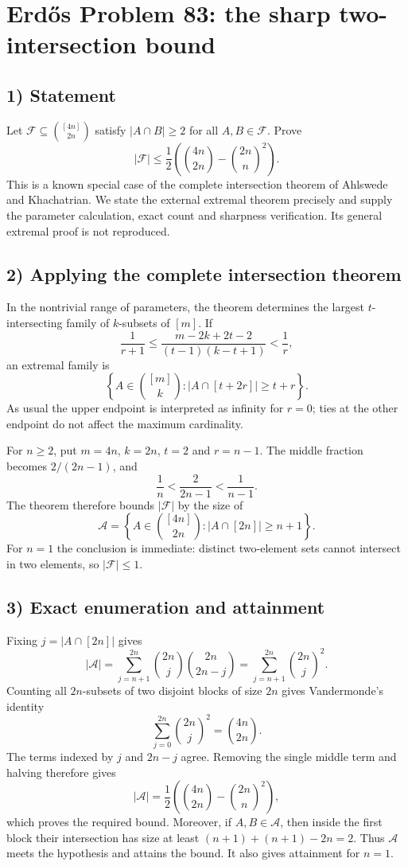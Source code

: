 \section{Erd\H{o}s Problem 83: the sharp two-intersection bound}

\subsection{1) Statement}
Let $\mathcal F\subseteq\binom{[4n]}{2n}$ satisfy
$|A\cap B|\geq2$ for all $A,B\in\mathcal F$. Prove
\[
 |\mathcal F|\leq\frac12\left(\binom{4n}{2n}-\binom{2n}{n}^2\right).
\]
This is a known special case of the complete intersection theorem
of Ahlswede and Khachatrian. We state the external extremal theorem
precisely and supply the parameter calculation, exact count and
sharpness verification. Its general extremal proof is not reproduced.

\subsection{2) Applying the complete intersection theorem}
In the nontrivial range of parameters, the theorem determines the
largest $t$-intersecting family of $k$-subsets of $[m]$. If
\[
 \frac1{r+1}\leq
 \frac{m-2k+2t-2}{(t-1)(k-t+1)}<\frac1r,
\]
an extremal family is
\[
 \left\{A\in\binom{[m]}k:|A\cap[t+2r]|\geq t+r\right\}.
\]
As usual the upper endpoint is interpreted as infinity for $r=0$;
ties at the other endpoint do not affect the maximum cardinality.

For $n\geq2$, put $m=4n$, $k=2n$, $t=2$ and $r=n-1$.
The middle fraction becomes $2/(2n-1)$, and
\[
 \frac1n<\frac2{2n-1}<\frac1{n-1}.
\]
The theorem therefore bounds $|\mathcal F|$ by the size of
\[
 \mathcal A=
 \left\{A\in\binom{[4n]}{2n}:|A\cap[2n]|\geq n+1\right\}.
\]
For $n=1$ the conclusion is immediate: distinct two-element sets
cannot intersect in two elements, so $|\mathcal F|\leq1$.

\subsection{3) Exact enumeration and attainment}
Fixing $j=|A\cap[2n]|$ gives
\[
 |\mathcal A|=\sum_{j=n+1}^{2n}
      \binom{2n}j\binom{2n}{2n-j}
   =\sum_{j=n+1}^{2n}\binom{2n}j^2.
\]
Counting all $2n$-subsets of two disjoint blocks of size $2n$ gives
Vandermonde's identity
\[
 \sum_{j=0}^{2n}\binom{2n}j^2=\binom{4n}{2n}.
\]
The terms indexed by $j$ and $2n-j$ agree. Removing the single
middle term and halving therefore gives
\[
 |\mathcal A|=\frac12\left(\binom{4n}{2n}-\binom{2n}n^2\right),
\]
which proves the required bound. Moreover, if $A,B\in\mathcal A$,
then inside the first block their intersection has size at least
$(n+1)+(n+1)-2n=2$. Thus $\mathcal A$ meets the hypothesis and
attains the bound. It also gives attainment for $n=1$.

